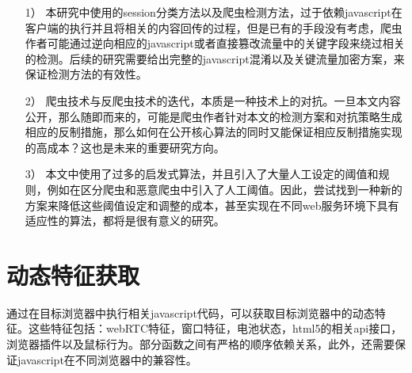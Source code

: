\documentclass[doctor,privacy,twoside]{buaa_mac}
\begin{document}
\begin{itemize}
\item[1）] 本研究中使用的session分类方法以及爬虫检测方法，过于依赖javascript在客户端的执行并且将相关的内容回传的过程，但是已有的手段没有考虑，爬虫作者可能通过逆向相应的javascript或者直接篡改流量中的关键字段来绕过相关的检测。后续的研究需要给出完整的javascript混淆以及关键流量加密方案，来保证检测方法的有效性。

\item[2）]  爬虫技术与反爬虫技术的迭代，本质是一种技术上的对抗。一旦本文内容公开，那么随即而来的，可能是爬虫作者针对本文的检测方案和对抗策略生成相应的反制措施，那么如何在公开核心算法的同时又能保证相应反制措施实现的高成本？这也是未来的重要研究方向。

\item[3）] 本文中使用了过多的启发式算法，并且引入了大量人工设定的阈值和规则，例如在区分爬虫和恶意爬虫中引入了人工阈值。因此，尝试找到一种新的方案来降低这些阈值设定和调整的成本，甚至实现在不同web服务环境下具有适应性的算法，都将是很有意义的研究。

\end{itemize}




\appendix

\section{动态特征获取}

通过在目标浏览器中执行相关javascript代码，可以获取目标浏览器中的动态特征。这些特征包括：webRTC特征，窗口特征，电池状态，html5的相关api接口，浏览器插件以及鼠标行为。部分函数之间有严格的顺序依赖关系，此外，还需要保证javascript在不同浏览器中的兼容性。
\end{document}
